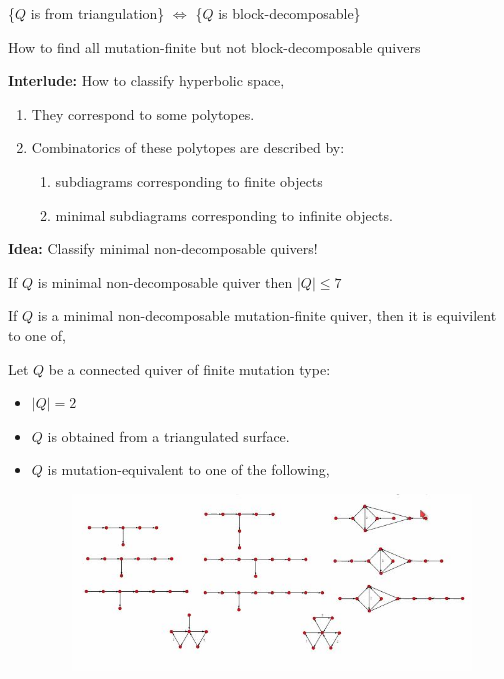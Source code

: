 \documentclass{article}
\begin{document}
\begin{prop}
  \{$Q$ is from triangulation\} $\iff$ \{$Q$ is block-decomposable\}
\end{prop}

\begin{question}
  How to find all mutation-finite but not block-decomposable quivers
\end{question}

\textbf{Interlude:} How to classify hyperbolic space,\\
\begin{enumerate}
  \item They correspond to some polytopes.
  \item Combinatorics of these polytopes are described by:
  \begin{enumerate}
    \item subdiagrams corresponding to finite objects
    \item minimal subdiagrams corresponding to infinite objects.
  \end{enumerate}
\end{enumerate}

\textbf{Idea:} Classify minimal non-decomposable quivers!

\begin{nlemma}[]
  If $Q$ is minimal non-decomposable quiver then $|Q| \le 7$
\end{nlemma}

\begin{nlemma}[]
  If $Q$ is a minimal non-decomposable mutation-finite quiver, then it is equivilent to one of,

\end{nlemma}


\begin{nthm}[]
  Let $Q$ be a connected quiver of finite mutation type:
  \begin{itemize}
    \item $|Q| = 2$
    \item $Q$ is obtained from a triangulated surface.
    \item $Q$ is mutation-equivalent to one of the following,
    \begin{figure}[!ht]
    \centering
    \includegraphics{./figures/L3.9}
    \end{figure}
  \end{itemize}
\end{nthm}
\end{document}

